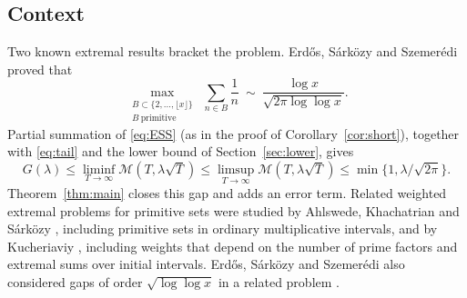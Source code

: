 \documentclass[11pt,a4paper]{article}
\numberwithin{equation}{section}
\theoremstyle{plain}
\theoremstyle{definition}
\theoremstyle{remark}
\newcommand{\cM}{\mathcal{M}}
\begin{document}
\subsection{Context}
Two known extremal results bracket the problem. Erd\H{o}s, S\'ark\"ozy and Szemer\'edi \cite[p.~484]{ESS1} proved that
\begin{equation}\label{eq:ESS}
\max_{\substack{B\subset\{2,\dots,\lfloor x\rfloor\}\\ B\ \text{primitive}}}\ \sum_{n\in B}\frac1n\ \sim\ \frac{\log x}{\sqrt{2\pi\log\log x}}.
\end{equation}
Partial summation of \eqref{eq:ESS} (as in the proof of Corollary~\ref{cor:short}), together with \eqref{eq:tail} and the lower bound of Section~\ref{sec:lower}, gives
\[
G(\lambda)\le\liminf_{T\to\infty}\cM(T,\lambda\sqrt T)\le\limsup_{T\to\infty}\cM(T,\lambda\sqrt T)\le\min\bigl\{1,\lambda/\sqrt{2\pi}\bigr\}.
\]
Theorem~\ref{thm:main} closes this gap and adds an error term. Related weighted extremal problems for primitive sets were studied by Ahlswede, Khachatrian and S\'ark\"ozy \cite[Theorems~1--3]{AKS}, including primitive sets in ordinary multiplicative intervals, and by Kucheriaviy \cite{Kuch}, including weights that depend on the number of prime factors and extremal sums over initial intervals. Erd\H{o}s, S\'ark\"ozy and Szemer\'edi also considered gaps of order $\sqrt{\log\log x}$ in a related problem \cite[p.~15]{ESS2}.
\end{document}
